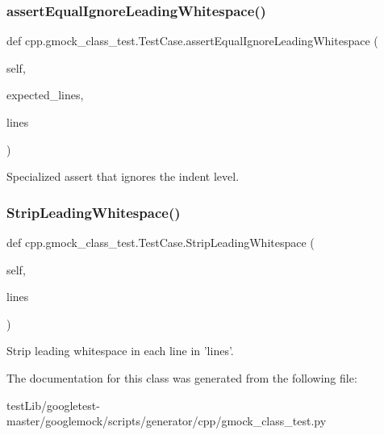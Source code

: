 \subsubsection{\texorpdfstring{assert\+Equal\+Ignore\+Leading\+Whitespace()}{assertEqualIgnoreLeadingWhitespace()}}
{\footnotesize\ttfamily def cpp.\+gmock\+\_\+class\+\_\+test.\+Test\+Case.\+assert\+Equal\+Ignore\+Leading\+Whitespace (\begin{DoxyParamCaption}\item[{}]{self,  }\item[{}]{expected\+\_\+lines,  }\item[{}]{lines }\end{DoxyParamCaption})}

\begin{DoxyVerb}Specialized assert that ignores the indent level.\end{DoxyVerb}
 \mbox{\label{classcpp_1_1gmock__class__test_1_1TestCase_a366b15717eebc41e397357868c5734c5}} 
\subsubsection{\texorpdfstring{Strip\+Leading\+Whitespace()}{StripLeadingWhitespace()}}
{\footnotesize\ttfamily def cpp.\+gmock\+\_\+class\+\_\+test.\+Test\+Case.\+Strip\+Leading\+Whitespace (\begin{DoxyParamCaption}\item[{}]{self,  }\item[{}]{lines }\end{DoxyParamCaption})}

\begin{DoxyVerb}Strip leading whitespace in each line in 'lines'.\end{DoxyVerb}
 

The documentation for this class was generated from the following file\+:\begin{DoxyCompactItemize}
\item 
test\+Lib/googletest-\/master/googlemock/scripts/generator/cpp/gmock\+\_\+class\+\_\+test.\+py\end{DoxyCompactItemize}
